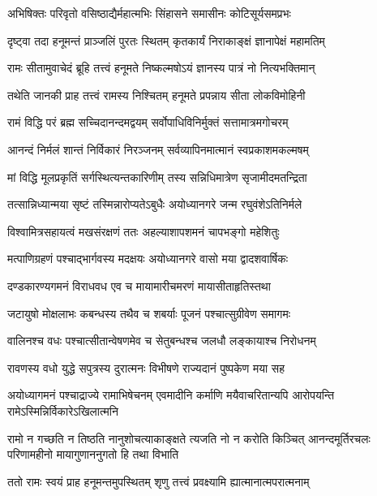 \twolineshloka
{अभिषिक्तः परिवृतो वसिष्ठाद्यैर्महात्मभिः}
{सिंहासने समासीनः कोटिसूर्यसमप्रभः} %

\twolineshloka
{दृष्ट्वा तदा हनूमन्तं प्राञ्जलिं पुरतः स्थितम्}
{कृतकार्यं निराकाङ्क्षं ज्ञानापेक्षं महामतिम्} %

\twolineshloka
{रामः सीतामुवाचेदं ब्रूहि तत्त्वं हनूमते}
{निष्कल्मषोऽयं ज्ञानस्य पात्रं नो नित्यभक्तिमान्} %

\twolineshloka
{तथेति जानकी प्राह तत्त्वं रामस्य निश्चितम्}
{हनूमते प्रपन्नाय सीता लोकविमोहिनी} %


\twolineshloka
{रामं विद्धि परं ब्रह्म सच्चिदानन्दमद्वयम्}
{सर्वोपाधिविनिर्मुक्तं सत्तामात्रमगोचरम्} %

\twolineshloka
{आनन्दं निर्मलं शान्तं निर्विकारं निरञ्जनम्}
{सर्वव्यापिनमात्मानं स्वप्रकाशमकल्मषम्} %

\twolineshloka
{मां विद्धि मूलप्रकृतिं सर्गस्थित्यन्तकारिणीम्}
{तस्य सन्निधिमात्रेण सृजामीदमतन्द्रिता} %

\twolineshloka
{तत्सान्निध्यान्मया सृष्टं तस्मिन्नारोप्यतेऽबुधैः}
{अयोध्यानगरे जन्म रघुवंशेऽतिनिर्मले} %

\twolineshloka
{विश्वामित्रसहायत्वं मखसंरक्षणं ततः}
{अहल्याशापशमनं चापभङ्गो महेशितुः} %

\twolineshloka
{मत्पाणिग्रहणं पश्चाद्भार्गवस्य मदक्षयः}
{अयोध्यानगरे वासो मया द्वादशवार्षिकः} %

\twolineshloka
{दण्डकारण्यगमनं विराधवध एव च}
{मायामारीचमरणं मायासीताहृतिस्तथा} %

\twolineshloka
{जटायुषो मोक्षलाभः कबन्धस्य तथैव च}
{शबर्याः पूजनं पश्चात्सुग्रीवेण समागमः} %

\twolineshloka
{वालिनश्च वधः पश्चात्सीतान्वेषणमेव च}
{सेतुबन्धश्च जलधौ लङ्कायाश्च निरोधनम्} %

\twolineshloka
{रावणस्य वधो युद्धे सपुत्रस्य दुरात्मनः}
{विभीषणे राज्यदानं पुष्पकेण मया सह} %

\threelineshloka
{अयोध्यागमनं पश्चाद्राज्ये रामाभिषेचनम्}
{एवमादीनि कर्माणि मयैवाचरितान्यपि}
{आरोपयन्ति रामेऽस्मिन्निर्विकारेऽखिलात्मनि} %

\fourlineindentedshloka
{रामो न गच्छति न तिष्ठति नानुशोचत्याकाङ्क्षते}
{त्यजति नो न करोति किञ्चित्}
{आनन्दमूर्तिरचलः परिणामहीनो}
{मायागुणाननुगतो हि तथा विभाति} %

\twolineshloka
{ततो रामः स्वयं प्राह हनूमन्तमुपस्थितम्}
{शृणु तत्त्वं प्रवक्ष्यामि ह्यात्मानात्मपरात्मनाम्} %

